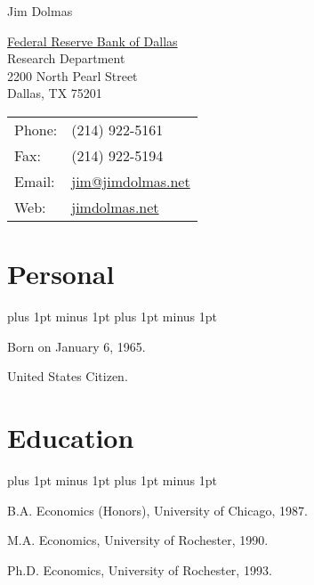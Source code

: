 \documentclass[letterpaper]{article}
\def\name{Jim Dolmas}
\renewenvironment{itemize}{
  \begin{list}{}{
    \setlength{\leftmargin}{1.5em}
    \itemsep -1pt plus 1pt minus 1pt
    \topsep -1pt plus 1pt minus 1pt
  }
}{
  \end{list}
}
\begin{document}
{\huge \name}

\vspace{0.25in}

\begin{minipage}{0.45\linewidth}
  \href{http://www.dallasfed.org/}{Federal Reserve Bank of Dallas} \\
  Research Department \\
  2200 North Pearl Street \\
  Dallas, TX 75201
\end{minipage}
\begin{minipage}{0.45\linewidth}
  \begin{tabular}{ll}
    Phone: & (214) 922-5161 \\
    Fax: &  (214) 922-5194 \\
    Email: & \href{mailto:jim@jimdolmas.net}{jim@jimdolmas.net} \\
    Web: & \href{https://jimdolmas.net/}{jimdolmas.net} \\
  \end{tabular}
\end{minipage}

\section*{Personal}
\begin{itemize}\itemsep -2pt
\item Born on January 6, 1965.
\item United States Citizen.
\end{itemize}

\section*{Education}
\begin{itemize}
  \item B.A. Economics (Honors), University of Chicago, 1987.
  \item M.A. Economics, University of Rochester, 1990.
  \item Ph.D. Economics, University of Rochester, 1993.
\end{itemize}
\end{document}
